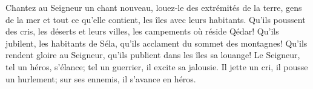 Chantez au Seigneur un chant nouveau, louez-le des extrémités de la terre,
	gens de la mer et tout ce qu’elle contient, les îles avec leurs habitants.
Qu’ils poussent des cris, les déserts et leurs villes, les campements où réside Qédar!
	Qu’ils jubilent, les habitants de Séla, qu’ils acclament du sommet des montagnes!
	Qu’ils rendent gloire au Seigneur, qu’ils publient dans les îles sa louange!
Le Seigneur, tel un héros, s’élance; tel un guerrier, il excite sa jalousie.
	Il jette un cri, il pousse un hurlement; sur ses ennemis, il s’avance en héros.
